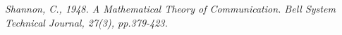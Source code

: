 \documentclass[11pt]{article}
\begin{document}
	 				
		
	
	
	 
	
	
		
	
	\pagebreak
	\begin{thebibliography}{1}	
		\textit{Shannon, C., 1948. A Mathematical Theory of Communication. Bell System Technical Journal, 27(3), pp.379-423.}
		
	\end{thebibliography}
\end{document}
